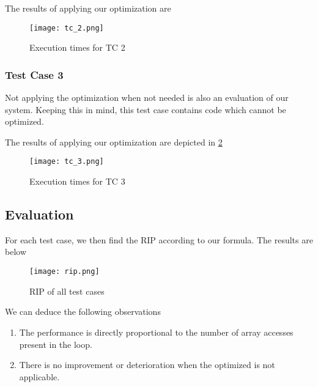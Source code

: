 The results of applying our optimization are

\begin{figure}[H]
	\centering
	\texttt{[image: tc\_2.png]}
	\caption{Execution times for TC 2}
	\label{TC_2}	
\end{figure}

\subsubsection{Test Case 3}

Not applying the optimization when not needed is also an evaluation of our system. Keeping this in mind, this test case contains code which cannot be optimized.

The results of applying our optimization are depicted in \ref{TC_3}

\begin{figure}[H]
	\centering
	\texttt{[image: tc\_3.png]}
	\caption{Execution times for TC 3}
	\label{TC_3}	
\end{figure}

\pagebreak

\subsection{Evaluation}

For each test case, we then find the RIP according to our formula. The results are below 

\begin{figure}[H]
	\centering
	\texttt{[image: rip.png]}
	\caption{RIP of all test cases}
	\label{RIP}	
\end{figure}

We can deduce the following observations

\begin{enumerate}
	\item The performance is directly proportional to the number of array accesses present in the loop.
	\item There is no improvement or deterioration when the optimized is not applicable. 
\end{enumerate}
